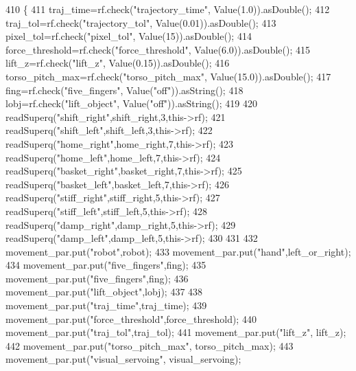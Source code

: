 \begin{DoxyCode}
410 \{
411     traj_time=rf.check(\textcolor{stringliteral}{"trajectory\_time"}, Value(1.0)).asDouble();
412     traj_tol=rf.check(\textcolor{stringliteral}{"trajectory\_tol"}, Value(0.01)).asDouble();
413     pixel_tol=rf.check(\textcolor{stringliteral}{"pixel\_tol"}, Value(15)).asDouble();
414     force_threshold=rf.check(\textcolor{stringliteral}{"force\_threshold"}, Value(6.0)).asDouble();
415     lift_z=rf.check(\textcolor{stringliteral}{"lift\_z"}, Value(0.15)).asDouble();
416     torso_pitch_max=rf.check(\textcolor{stringliteral}{"torso\_pitch\_max"}, Value(15.0)).asDouble();
417     fing=rf.check(\textcolor{stringliteral}{"five\_fingers"}, Value(\textcolor{stringliteral}{"off"})).asString();
418     lobj=rf.check(\textcolor{stringliteral}{"lift\_object"}, Value(\textcolor{stringliteral}{"off"})).asString();
419 
420     readSuperq(\textcolor{stringliteral}{"shift\_right"},shift_right,3,this->rf);
421     readSuperq(\textcolor{stringliteral}{"shift\_left"},shift_left,3,this->rf);
422     readSuperq(\textcolor{stringliteral}{"home\_right"},home_right,7,this->rf);
423     readSuperq(\textcolor{stringliteral}{"home\_left"},home_left,7,this->rf);
424     readSuperq(\textcolor{stringliteral}{"basket\_right"},basket_right,7,this->rf);
425     readSuperq(\textcolor{stringliteral}{"basket\_left"},basket_left,7,this->rf);
426     readSuperq(\textcolor{stringliteral}{"stiff\_right"},stiff_right,5,this->rf);
427     readSuperq(\textcolor{stringliteral}{"stiff\_left"},stiff_left,5,this->rf);
428     readSuperq(\textcolor{stringliteral}{"damp\_right"},damp_right,5,this->rf);
429     readSuperq(\textcolor{stringliteral}{"damp\_left"},damp_left,5,this->rf);
430 
431 
432     movement_par.put(\textcolor{stringliteral}{"robot"},robot);
433     movement_par.put(\textcolor{stringliteral}{"hand"},left_or_right);
434     movement_par.put(\textcolor{stringliteral}{"five\_fingers"},fing);
435     movement_par.put(\textcolor{stringliteral}{"five\_fingers"},fing);
436     movement_par.put(\textcolor{stringliteral}{"lift\_object"},lobj);
437 
438     movement_par.put(\textcolor{stringliteral}{"traj\_time"},traj_time);
439     movement_par.put(\textcolor{stringliteral}{"force\_threshold"},force_threshold);
440     movement_par.put(\textcolor{stringliteral}{"traj\_tol"},traj_tol);
441     movement_par.put(\textcolor{stringliteral}{"lift\_z"}, lift_z);
442     movement_par.put(\textcolor{stringliteral}{"torso\_pitch\_max"}, torso_pitch_max);
443     movement_par.put(\textcolor{stringliteral}{"visual\_servoing"}, visual_servoing);

\end{DoxyCode}
